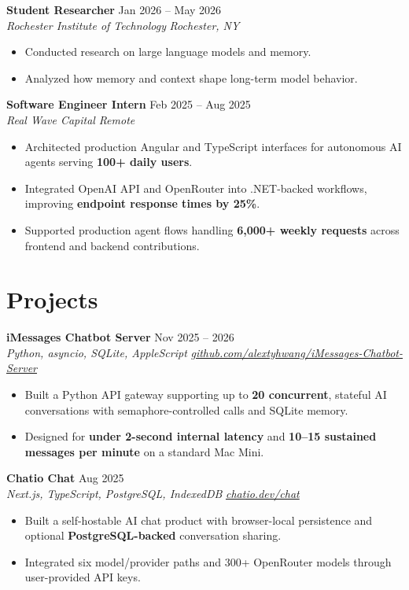 \documentclass[10pt,letterpaper]{article}
\newif\ifresumeFirstRole
\newcommand{\resumeRole}[4]{%
  \ifresumeFirstRole
    \global\resumeFirstRolefalse
  \else
    \vspace{0pt plus 1fill}%
  \fi
  \textbf{#1} \hfill #2\\
  \textit{#3} \hfill \textit{#4}
}
\begin{document}
\resumeRole{Student Researcher}{Jan 2026 -- May 2026}{Rochester Institute of Technology}{Rochester, NY}
\begin{itemize}
  \item Conducted research on large language models and memory.
  \item Analyzed how memory and context shape long-term model behavior.
\end{itemize}

\resumeRole{Software Engineer Intern}{Feb 2025 -- Aug 2025}{Real Wave Capital}{Remote}
\begin{itemize}
  \item Architected production Angular and TypeScript interfaces for autonomous AI agents serving \textbf{100+ daily users}.
  \item Integrated OpenAI API and OpenRouter into .NET-backed workflows, improving \textbf{endpoint response times by 25\%}.
  \item Supported production agent flows handling \textbf{6,000+ weekly requests} across frontend and backend contributions.
\end{itemize}

\section*{Projects}
\resumeRole{iMessages Chatbot Server}{Nov 2025 -- 2026}{Python, asyncio, SQLite, AppleScript}{\href{https://github.com/alextyhwang/iMessages-Chatbot-Server}{github.com/alextyhwang/iMessages-Chatbot-Server}}
\begin{itemize}
  \item Built a Python API gateway supporting up to \textbf{20 concurrent}, stateful AI conversations with semaphore-controlled calls and SQLite memory.
  \item Designed for \textbf{under 2-second internal latency} and \textbf{10--15 sustained messages per minute} on a standard Mac Mini.
\end{itemize}

\resumeRole{Chatio Chat}{Aug 2025}{Next.js, TypeScript, PostgreSQL, IndexedDB}{\href{https://chatio.dev/chat}{chatio.dev/chat}}
\begin{itemize}
  \item Built a self-hostable AI chat product with browser-local persistence and optional \textbf{PostgreSQL-backed} conversation sharing.
  \item Integrated six model/provider paths and 300+ OpenRouter models through user-provided API keys.
\end{itemize}
\end{document}
